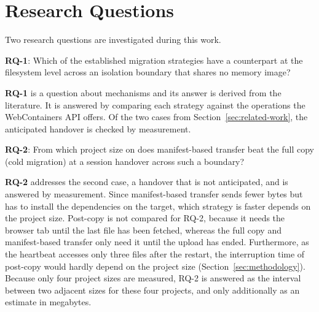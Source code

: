 \section{Research Questions}
\label{sec:research-questions}

Two research questions are investigated during this work.\medskip

\textbf{RQ-1}: Which of the established migration strategies have a counterpart at the filesystem level across an isolation boundary that shares no memory image?

\medskip
\textbf{RQ-1} is a question about mechanisms and its answer is derived from the literature. It is answered by comparing each strategy against the operations the WebContainers \ac{API} offers. Of the two cases from Section~\ref{sec:related-work}, the anticipated handover is checked by measurement.

\medskip
\textbf{RQ-2}: From which project size on does manifest-based transfer beat the full copy (cold migration) at a session handover across such a boundary?

\medskip
\textbf{RQ-2} addresses the second case, a handover that is not anticipated, and is answered by measurement. Since manifest-based transfer sends fewer bytes but has to install the dependencies on the target, which strategy is faster depends on the project size. Post-copy is not compared for RQ-2, because it needs the browser tab until the last file has been fetched, whereas the full copy and manifest-based transfer only need it until the upload has ended. Furthermore, as the heartbeat accesses only three files after the restart, the interruption time of post-copy would hardly depend on the project size (Section~\ref{sec:methodology}).
Because only four project sizes are measured, RQ-2 is answered as the interval between two adjacent sizes for these four projects, and only additionally as an estimate in megabytes.
